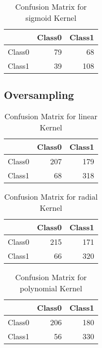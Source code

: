 \begin{table}[H]
\centering
\begin{tabular}{rrr}
  \hline
 & Class0 & Class1 \\ 
  \hline
Class0 &  79 &  68 \\ 
  Class1 &  39 & 108 \\ 
   \hline
\end{tabular}
\caption{Confusion Matrix for sigmoid Kernel} 
\end{table}

\subsection{Oversampling}

\begin{table}[H]
\centering
\begin{tabular}{rrr}
  \hline
 & Class0 & Class1 \\ 
  \hline
Class0 & 207 & 179 \\ 
  Class1 &  68 & 318 \\ 
   \hline
\end{tabular}
\caption{Confusion Matrix for linear Kernel} 
\end{table}

\begin{table}[H]
\centering
\begin{tabular}{rrr}
  \hline
 & Class0 & Class1 \\ 
  \hline
Class0 & 215 & 171 \\ 
  Class1 &  66 & 320 \\ 
   \hline
\end{tabular}
\caption{Confusion Matrix for radial Kernel} 
\end{table}

\begin{table}[H]
\centering
\begin{tabular}{rrr}
  \hline
 & Class0 & Class1 \\ 
  \hline
Class0 & 206 & 180 \\ 
  Class1 &  56 & 330 \\ 
   \hline
\end{tabular}
\caption{Confusion Matrix for polynomial Kernel} 
\end{table}

